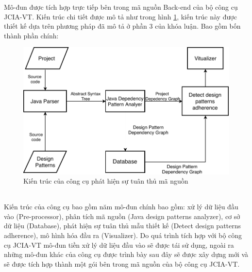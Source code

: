 \documentclass[12pt]{report}
\begin{document}
\noindent Mô-đun được tích hợp trực tiếp bên trong mã nguồn Back-end của bộ công cụ JCIA-VT. Kiến trúc chi tiết được mô tả như trong hình \ref{fig:detect_design_pattern_architexture}, kiến trúc này được thiết kế dựa trên phương pháp đã mô tả ở phần 3 của khóa luận. Bao gồm bốn thành phần chính:
\begin{figure}[!htbp]
	\centering
	\includegraphics[scale=1.09]{images/c4_architexture.pdf}
	\caption{Kiến trúc của công cụ phát hiện sự tuân thủ mã nguồn}
	\label{fig:detect_design_pattern_architexture}
\end{figure}\\
Kiến trúc của công cụ bao gồm năm mô-đun chính bao gồm: xử lý dữ liệu đầu vào (Pre-processor), phân tích mã nguồn (Java design patterns analyzer), cơ sở dữ liệu (Database), phát hiện sự tuân thủ mẫu thiết kế (Detect design patterns adherence), mô hình hóa đầu ra (Visualizer). Do quá trình tích hợp với bộ công cụ JCIA-VT mô-đun tiền xử lý dữ liệu đầu vào sẽ được tái sử dụng, ngoài ra những mô-đun khác của công cụ được trình bày sau đây sẽ được xây dựng mới và sẽ được tích hợp thành một gói bên trong mã nguồn của bộ công cụ  JCIA-VT.
\end{document}
